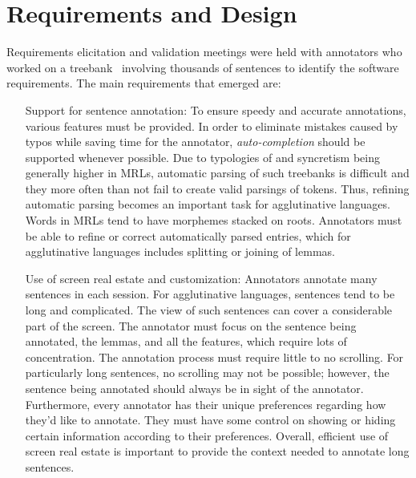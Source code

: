 \section{Requirements and Design}
\label{sec:requirements}

Requirements elicitation and validation meetings were held with annotators who worked on a treebank~\cite{anon} involving thousands of sentences to identify the software requirements.
The main requirements that emerged are:
\begin{itemize}[before=\normalfont, font=\itshape, align=left,noitemsep,topsep=0pt,parsep=3pt,partopsep=0pt,labelsep=3pt,align=left]
    \item[Support for sentence annotation:]
        To ensure speedy and accurate annotations, various features must be provided.
        In order to eliminate mistakes caused by typos while saving time for the annotator, \textit{auto-completion} should be supported whenever possible.
        Due to typologies of and syncretism being generally higher in MRLs, automatic parsing of such treebanks is difficult and they more often than not fail to create valid parsings of tokens.
        Thus, refining automatic parsing becomes an important task for agglutinative languages.
        Words in MRLs tend to have morphemes stacked on roots.
        Annotators must be able to refine or correct automatically parsed entries, which for agglutinative languages includes splitting or joining of lemmas.
    \item[Use of screen real estate and customization:]
        Annotators annotate many sentences in each session.
        For agglutinative languages, sentences tend to be long and complicated.
        The view of such sentences can cover a considerable part of the screen.
        The annotator must focus on the sentence being annotated, the lemmas, and all the features, which require lots of concentration.
        The annotation process must require little to no scrolling.
        For particularly long sentences, no scrolling may not be possible; however, the sentence being annotated should always be in sight of the annotator.
        Furthermore, every annotator has their unique preferences regarding how they'd like to annotate.
        They must have some control on showing or hiding certain information according to their preferences.
        Overall, efficient use of screen real estate is important to provide the context needed to annotate long sentences.

\end{itemize}
